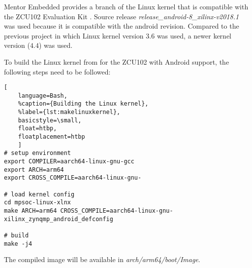 Mentor Embedded provides a branch of the Linux kernel that is compatible with the ZCU102 Evaluation Kit \cite{linuxkernel}.
Source release \emph{release_android-8_xilinx-v2018.1} was used because it is compatible with the android revision. Compared to the previous project \cite{oldrepo} in which Linux kernel version $3.6$ was used, a newer kernel version ($4.4$) was used.

To build the Linux kernel from \cite{linuxkernel} for the ZCU102 with Android support,
the following steps need to be followed:
\begin{lstlisting}[
	language=Bash,
	%caption={Building the Linux kernel},
	%label={lst:makelinuxkernel},
	basicstyle=\small,
	float=htbp,
	floatplacement=htbp
	]
# setup environment
export COMPILER=aarch64-linux-gnu-gcc
export ARCH=arm64
export CROSS_COMPILE=aarch64-linux-gnu-	

# load kernel config
cd mpsoc-linux-xlnx
make ARCH=arm64 CROSS_COMPILE=aarch64-linux-gnu- xilinx_zynqmp_android_defconfig

# build
make -j4
\end{lstlisting}

The compiled image will be available in \emph{arch/arm64/boot/Image}.